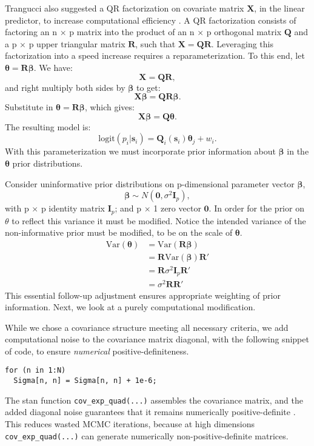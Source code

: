 Trangucci also suggested a QR factorization on covariate matrix $\pmb{X}$, in the linear predictor, to increase computational efficiency \citep{Trangucci}. A QR factorization consists of factoring an n $\times$ p matrix into the product of an n $\times$ p orthogonal matrix $\pmb{Q}$ and a p $\times$ p upper triangular matrix $\pmb{R}$, such that $\pmb{X} = \pmb{QR}$. Leveraging this factorization into a speed increase requires a reparameterization. To this end, let $\pmb{\theta} = \pmb{R \beta}$. We have:
$$ \pmb{X} = \pmb{QR},$$
and right multiply both sides by $\pmb{\beta}$ to get:
$$ \pmb{X \beta} = \pmb{QR \beta}. $$
Substitute in $\pmb{\theta} = \pmb{R \beta}$, which gives:
$$ \pmb{X \beta} = \pmb{Q \theta}. $$
The resulting model is:
\begin{equation} \label{eq:reparam}
\text{logit}(p_{i}|\pmb{s}_{i}) = \pmb{Q}_{i}(\pmb{s}_{i}) \pmb{\theta}_{j} + w_{i}.
\end{equation}
With this parameterization we must incorporate prior information about $\pmb{\beta}$ in the $\pmb{\theta}$ prior distributions. 

Consider uninformative prior distributions on p-dimensional parameter vector $\pmb{\beta}$,
\begin{equation}
\pmb{\beta} \sim N(\pmb{0}, \sigma^{2}\pmb{I}_{p}), 
\end{equation}
with p $\times$ p identity matrix $\pmb{I}_{p}$; and p $\times$ 1 zero vector $\pmb{0}$. In order for the prior on $\theta$ to reflect this variance it must be modified. Notice the intended variance of the non-informative prior must be modified, to be on the scale of $\pmb{\theta}$.
\begin{align}
\text{Var}(\pmb{\theta}) &= \text{Var}(\pmb{R \beta}) \\
&= \pmb{R}\text{Var}(\pmb{\beta})\pmb{R}' \\
&= \pmb{R}\sigma^{2}\pmb{I}_{p}\pmb{R}' \\
&= \sigma^{2} \pmb{R}\pmb{R}'
\end{align}
This essential follow-up adjustment ensures appropriate weighting of prior information. Next, we look at a purely computational modification.

While we chose a covariance structure meeting all necessary criteria, we add computational noise to the covariance matrix diagonal, with the following snippet of code, to ensure {\it numerical} positive-definiteness.
\begin{verbatim}
for (n in 1:N)
  Sigma[n, n] = Sigma[n, n] + 1e-6;
\end{verbatim}
The stan function \verb|cov_exp_quad(...)| assembles the covariance matrix, and the added diagonal noise guarantees that it remains numerically positive-definite \citep{Trangucci2017}. This reduces wasted MCMC iterations, because at high dimensions \verb|cov_exp_quad(...)| can generate numerically non-positive-definite matrices.

